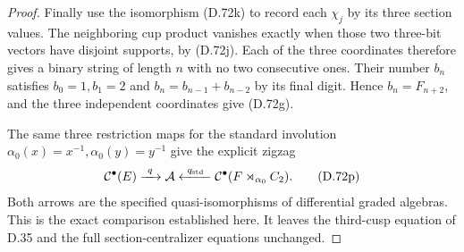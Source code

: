 \begin{proof}
Finally use the isomorphism (D.72k) to record
each $\chi_j$ by its three section values.
The neighboring cup product vanishes exactly
when those two three-bit vectors have disjoint
supports, by (D.72j). Each of the three coordinates
therefore gives a binary string of length $n$
with no two consecutive ones. Their number
$b_n$ satisfies $b_0=1,b_1=2$ and
$b_n=b_{n-1}+b_{n-2}$ by its final digit.
Hence $b_n=F_{n+2}$, and the three independent
coordinates give (D.72g).

The same three restriction maps for the standard
involution $\alpha_0(x)=x^{-1},\alpha_0(y)=y^{-1}$
give the explicit zigzag
\[
 \mathcal C^\bullet(E)\xrightarrow{\ q\ }\mathcal A
       \xleftarrow{\ q_{\rm std}\ }
       \mathcal C^\bullet(F\rtimes_{\alpha_0}C_2).
                                                               \tag{D.72p}
\]
Both arrows are the specified quasi-isomorphisms
of differential graded algebras. This is the
exact comparison established here. It leaves
the third-cusp equation of D.35 and the full
section-centralizer equations unchanged.
\end{proof}
